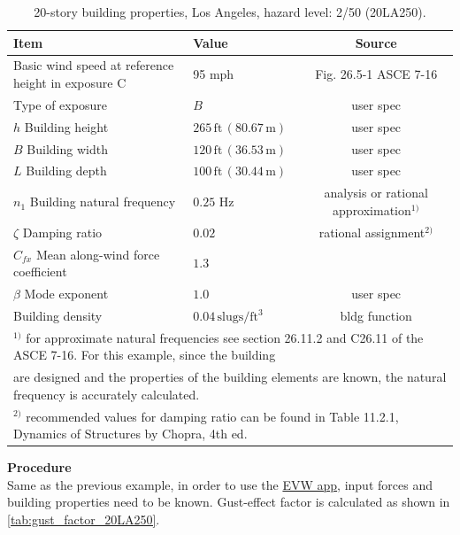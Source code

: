 \documentclass[onecolumn, fleqn]{article}
\newcommand{\ft}{\ensuremath{\,\mathrm{ft}}}
\newcommand{\m}{\ensuremath{\,\mathrm{m}}}
\begin{document}
\begin{table}[H]
\centering \caption{20-story building properties, Los Angeles, hazard level: 2/50 (20LA250).}
\label{tab:prop_20LA250}
\begin{tabular}{llc}
\toprule
Item		& Value		& Source		\\
\midrule
Basic wind speed at reference height in exposure C	& 95 mph						& Fig. 26.5-1 ASCE 7-16		\\
Type of exposure									& $B$							& user spec					\\
$h$ Building height									& $265\ft \,(80.67\m)$			& user spec					\\
$B$ Building width									& $120\ft \,(36.53\m)$			& user spec					\\
$L$ Building depth									& $100\ft \,(30.44\m)$			& user spec					\\
$n_1$ Building natural frequency					& $0.25$ Hz						& analysis or rational approximation$^{1)}$\\
$\zeta$ Damping ratio								& $0.02$						& rational assignment$^{2)}$		\\
$C_{fx}$ Mean along-wind force coefficient			& $1.3$							& 							\\
$\beta$ Mode exponent								& $1.0$							& user spec					\\
Building density									& $0.04 \,\mathrm{slugs/ft^3}$	& bldg function				\\
\bottomrule
\multicolumn{3}{l}{\footnotesize $^{1)}$ for approximate natural frequencies see section 26.11.2 and C26.11 of the ASCE 7-16. For this example, since the building}	\\
\multicolumn{3}{l}{\footnotesize \hspace{3mm} are designed and the properties of the building elements are known, the natural frequency is accurately calculated.}	\\
\multicolumn{3}{l}{\footnotesize $^{2)}$ recommended values for damping ratio can be found in Table 11.2.1, Dynamics of Structures by
Chopra, 4th ed. \citep{ChopraAnilK2012Dos}}
\end{tabular}
\end{table}

\noindent\textbf{Procedure}\\
\indent Same as the previous example, in order to use the \href{https://simcenter.designsafe-ci.org/learning-tools/evw-application/}{EVW app}, input forces and building properties need to be known. Gust-effect factor is calculated as shown in \cref{tab:gust_factor_20LA250}.
\end{document}

